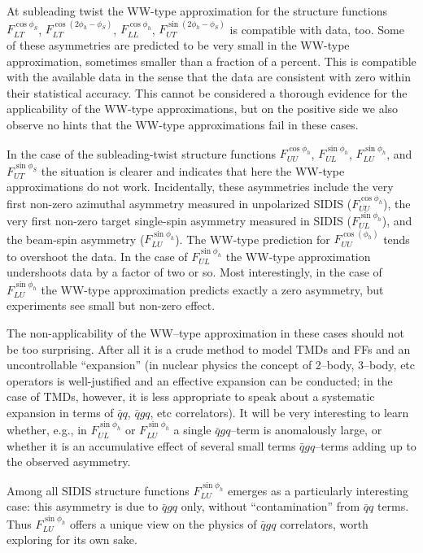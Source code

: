 \documentclass[a4paper,11pt]{article}
\newcommand{\blue}[1]{{\color{blue} #1}}
\newcommand{\ps}[1]{\blue{#1}}
\begin{document}
At subleading twist the WW-type approximation for the
structure functions
	$F_{LT}^{\cos\phi_S}$,
	$F_{LT}^{\cos(2\phi_h-\phi_S)}$,
	$F_{LL}^{\cos\phi_h}$,
	$F_{UT}^{\sin(2\phi_h-\phi_S)}$
is compatible with data, too. Some of these asymmetries are
predicted to be very small in the WW-type approximation,
sometimes smaller than a fraction of a percent. This is
compatible with the available data in the sense that the
data are consistent with zero within their statistical
accuracy. This cannot be considered a thorough evidence
for the applicability of the WW-type approximations, but
on the \ps{positive side we also observe no hints}
that the WW-type approximations fail in these cases.

In the case of the subleading-twist structure functions
	$F_{UU}^{\cos\phi_h}$,
	$F_{UL}^{\sin\phi_h}$,
	$F_{LU}^{\sin\phi_h}$, and
	$F_{UT}^{\sin\phi_S}$
the situation is clearer and indicates that here the WW-type
approximations do not work.
Incidentally, these asymmetries include the very first non-zero azimuthal
asymmetry measured in unpolarized SIDIS ($F_{UU}^{\cos\phi_h}$),
the very first non-zero target single-spin asymmetry measured in SIDIS
($F_{UL}^{\sin\phi_h}$), and the beam-spin asymmetry ($F_{LU}^{\sin\phi_h}$).
The WW-type prediction for $F_{UU}^{\cos(\phi_h)}$ tends to overshoot
the data. In the case of $F_{UL}^{\sin\phi_h}$ the WW-type approximation
undershoots data by a factor of two or so.
Most interestingly, in the case of $F_{LU}^{\sin\phi_h}$ the WW-type
approximation predicts exactly a zero asymmetry, but experiments
see small but non-zero effect.

The non-applicability of the WW--type approximation in these 
cases should not be too surprising. After all it is a crude method
to model TMDs and FFs and an uncontrollable ``expansion''
(in nuclear physics the concept of 2--body, 3--body, etc operators
is well-justified and an effective expansion can be conducted; in
the case of TMDs, however, it is less appropriate to speak about a
systematic expansion in terms of $\bar{q}q$, $\bar{q}gq$, etc
correlators). It will be very interesting to learn whether, e.g.,
in $F_{UL}^{\sin\phi_h}$ or $F_{LU}^{\sin\phi_h}$ a single $\bar{q}gq$--term
is anomalously large, or whether it is an accumulative effect of
several small terms $\bar{q}gq$--terms adding up to the observed asymmetry.

Among all SIDIS structure functions $F_{LU}^{\sin\phi_h}$ emerges as
a particularly interesting case: this asymmetry is due to $\bar{q}gq$
only, without ``contamination'' from $\bar{q}q$ terms.
Thus $F_{LU}^{\sin\phi_h}$ offers a unique view on the physics of $\bar{q}gq$
correlators, worth exploring for its own sake.
\end{document}
